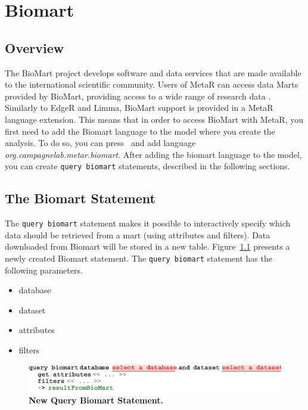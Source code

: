 

\chapter{Biomart}\label{chap:Biomart}

\section{Overview}
The BioMart project develops software and data services that are made available to the international scientific community. Users of MetaR can access data Marts provided by BioMart, providing access to a wide range of research data . Similarly to EdgeR and Limma, BioMart support is provided in a MetaR language extension. This means that in order to access BioMart with MetaR, you first need to add the Biomart language to the model where you create the analysis. To do so, you can press~ and add language \textit{org\allowbreak.campagnelab\allowbreak.metar\allowbreak.biomart}. After adding the biomart language to the model, you can create \texttt{query biomart} statements, described in the following sections. 

\section{The Biomart Statement}
The \texttt{query biomart} statement makes it possible to interactively specify which data should be retrieved from a mart (using attributes and filters). Data downloaded from Biomart will be stored in a new table. Figure~\ref{fig:NewBiomart} presents a newly created Biomart statement.
The \texttt{query biomart} statement has the following parameters.
\begin{itemize}
\item database
\item dataset
\item attributes
\item filters
\end{itemize} 


 \begin{figure}[h!tbp]
  \centering
  \includegraphics[width=\figWidthWide]{figures/NewBiomart.pdf}
\caption[New Query Biomart Statement.]{\textbf{New Query Biomart Statement.}}
\label{fig:NewBiomart}
\end{figure}



